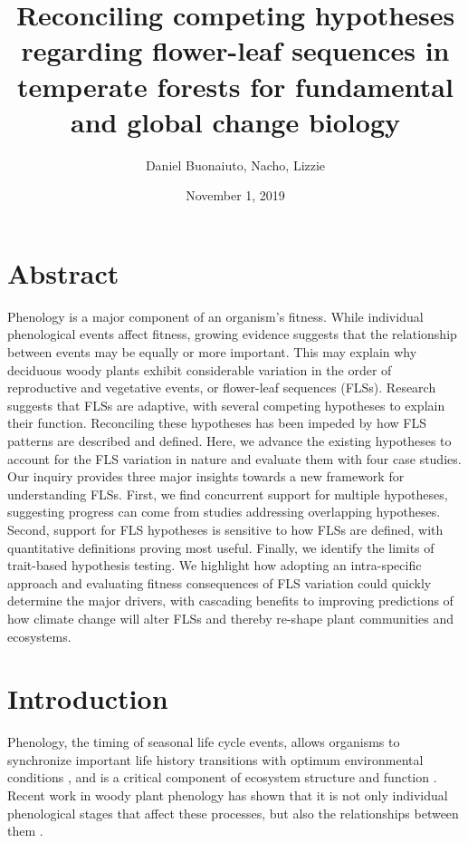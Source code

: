 \documentclass[12pt]{article}
\title{Reconciling competing hypotheses regarding flower-leaf sequences in temperate forests for fundamental and global change biology}
\author{Daniel Buonaiuto, Nacho, Lizzie}
\date{November 1, 2019}
\begin{document}
\maketitle

\begin{enumerate}
\end{enumerate}
\section*{Abstract}
Phenology is a major component of an organism's fitness. While individual phenological events affect fitness, growing evidence suggests that the relationship between events may be equally or more important. This may explain why deciduous woody plants exhibit considerable variation in the order of reproductive and vegetative events, or flower-leaf sequences (FLSs). Research suggests that FLSs are adaptive, with several competing hypotheses to explain their function. Reconciling these hypotheses has been impeded by how FLS patterns are described and defined. Here, we advance the existing hypotheses to account for the FLS variation in nature and evaluate them with four case studies. Our inquiry provides three major insights towards a new framework for understanding FLSs. First, we find concurrent support for multiple hypotheses, suggesting progress can come from studies addressing overlapping hypotheses. Second, support for FLS hypotheses is sensitive to how FLSs are defined, with quantitative definitions proving most useful. Finally, we identify the limits of trait-based hypothesis testing. We highlight how adopting an intra-specific approach and evaluating fitness consequences of FLS variation could quickly determine the major drivers, with cascading benefits to improving predictions of how climate change will alter FLSs and thereby re-shape plant communities and ecosystems.


\section*{Introduction}
\indent \indent Phenology, the timing of seasonal life cycle events, allows organisms to synchronize important life history transitions with optimum environmental conditions \citep{Forrest2010}, and is a critical component of ecosystem structure and function \citep{Cleland2007,Piao2007}. Recent work in woody plant phenology has shown that it is not only individual phenological stages that affect these processes, but also the relationships between them \citep{Ettinger2018}.\\
\end{document}
